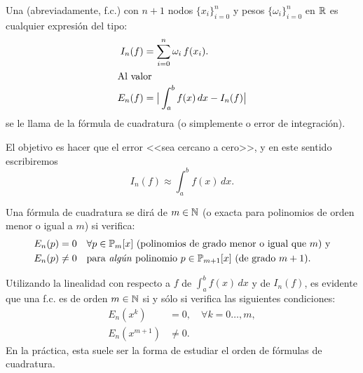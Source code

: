 \begin{definition}
  \label{def:formula-cuadratura}
  Una  (abreviadamente, f.c.) con
  $n+1$ nodos $\{x_i\}_{i=0}^n$ y pesos $\{\omega_i\}_{i=0}^n$ en
  $\operatorname{{\mathbb R}}$ es cualquier expresión del tipo:
  \begin{align}
    \label{eq:f.cuadratura}
    I_n(f)&=\sum_{i=0}^n \omega_i \, f(x_i).
    \\
    \intertext{Al valor}
    \notag
    E_n(f) &= \big|\int_a^b f(x)\, dx - I_n(f)\big|
  \end{align}
  se le llama  de la fórmula de cuadratura (o
  simplemente  o error de integración).
\end{definition}
El objetivo es hacer que el error <<sea cercano a cero>>, y en este
sentido escribiremos
\begin{equation*}
  I_n(f) \approx \int_a^b f(x)\, dx.
\end{equation*}

\begin{definition}
  \label{def:2}
  Una fórmula de cuadratura se dirá de  $m\in\operatorname{{\mathbb N}}$ (o
  exacta para polinomios de orden menor o igual a $m$) si verifica:
  \begin{align*}
    E_n(p)&=0 \quad \forall p\in\operatorname{{\mathbb P}}_m[x] \text{ (polinomios
      de grado menor o igual que $m$) y}
    \\
    E_n(p)&\neq 0 \quad \text{para \emph{algún} polinomio }
    p\in\operatorname{{\mathbb P}}_{m+1}[x] \text{ (de grado $m+1$)}.
  \end{align*}
\end{definition}
\begin{remark}
  \label{rk:5}
  Utilizando la linealidad con respecto a $f$ de $\int_a^bf(x)\,dx$ y
  de $I_n(f)$, es evidente que una f.c. es de orden $m\in\operatorname{{\mathbb N}}$ si
  y sólo si verifica las siguientes condiciones:
  \begin{align*}
    E_n(x^k)&=0, \quad \forall k=0\dots,m,
    \\
    E_n(x^{m+1})&\neq 0.
  \end{align*}
  En la práctica, esta suele ser la forma de estudiar el orden de
  fórmulas de cuadratura.
\end{remark}

